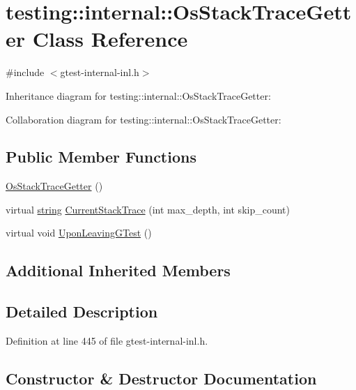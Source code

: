 \hypertarget{classtesting_1_1internal_1_1_os_stack_trace_getter}{}\section{testing\+:\+:internal\+:\+:Os\+Stack\+Trace\+Getter Class Reference}
\label{classtesting_1_1internal_1_1_os_stack_trace_getter}


{\ttfamily \#include $<$gtest-\/internal-\/inl.\+h$>$}



Inheritance diagram for testing\+:\+:internal\+:\+:Os\+Stack\+Trace\+Getter\+:


Collaboration diagram for testing\+:\+:internal\+:\+:Os\+Stack\+Trace\+Getter\+:
\subsection*{Public Member Functions}
\begin{DoxyCompactItemize}
\item 
\hyperlink{classtesting_1_1internal_1_1_os_stack_trace_getter_aa40b3120c0ae4ec640de8b577ab7da17}{Os\+Stack\+Trace\+Getter} ()
\item 
virtual \hyperlink{namespacetesting_1_1internal_a8e8ff5b11e64078831112677156cb111}{string} \hyperlink{classtesting_1_1internal_1_1_os_stack_trace_getter_ad85d7766a222befa3e7f3c6932046ac2}{Current\+Stack\+Trace} (int max\+\_\+depth, int skip\+\_\+count)
\item 
virtual void \hyperlink{classtesting_1_1internal_1_1_os_stack_trace_getter_a8ae0237629b6b5672b4b5ef8e292205c}{Upon\+Leaving\+G\+Test} ()
\end{DoxyCompactItemize}
\subsection*{Additional Inherited Members}


\subsection{Detailed Description}


Definition at line 445 of file gtest-\/internal-\/inl.\+h.



\subsection{Constructor \& Destructor Documentation}
